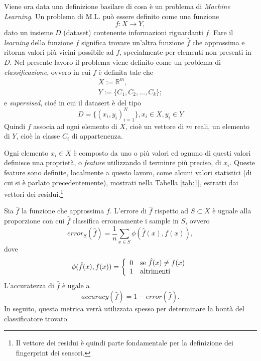 \documentclass[Lau,binding=0.6cm,noexaminfo]{sapthesis}
\begin{document}
Viene ora data una definizione basilare di cosa \`e un problema di \textit{Machine Learning}.
Un problema di M.L. pu\`o essere definito come una funzione 
\begin{equation}
f: X \to Y,\label{eq:3}
\end{equation}
dato un insieme $D$ (dataset) contenente informazioni riguardanti $f$.
Fare il \textit{learning} della funzione $f$ significa trovare un'altra funzione $\hat{f}$ che approssima e ritorna valori più vicini possibile ad $f$, specialmente per elementi non presenti in $D$.
Nel presente lavoro il problema viene definito come un problema di \textit{classificazione}, ovvero in cui $f$ \`e definita tale che
\begin{equation}
    \begin{array}{l}
    X := \mathbb{R}^m, \\
    Y := \{ C_1, C_2, \ldots, C_k \};
    \end{array}
\end{equation} 
e \textit{supervised}, cio\'e in cui il datasert \`e del tipo
\begin{equation}
    D = \{ (x_i, y_i)_{i=1}^N \}, x_i\in X, y_i\in Y
\end{equation}
Quindi $f$ associa ad ogni elemento di $X$, cio\`e un vettore di $m$ reali, un elemento di $Y$, cio\`e la classe $C_i$ di appartenenza.

Ogni elemento $x_i \in X$ \`e composto da uno o pi\`u valori ed ognuno di questi valori definisce una propriet\`a, o \textit{feature} utilizzando il terminre pi\`u preciso, di $x_i$. 
Queste feature sono definite, localmente a questo lavoro, come alcuni valori statistici (di cui si \`e parlato precedentemente), mostrati nella Tabella \ref{tab:1}, estratti dai vettori dei residui.\footnote{Il vettore dei residui \`e quindi parte fondamentale per la definizione dei fingerprint dei sensori.}

Sia $\hat{f}$ la funzione che approssima $f$. L'errore di $\hat{f}$ rispetto ad $S \subset X$ \`e uguale alla proporzione con cui $\hat{f}$ classifica erroneamente i sample in $S$, ovvero
\begin{equation}
    error_{S}(\hat{f}) = \frac{1}{n} \sum_{x\in S} \phi(\hat{f}(x), f(x)),
\end{equation}
dove
\begin{equation}
    \phi(\hat{f}(x), f(x)) = \left\{
        \begin{array}{rl}
            0 & \mbox{se $ \hat{f}(x) \ne f(x)$}\\
            1 & \mbox{altrimenti}
        \end{array}
    \right
    .
\end{equation}
L'accuratezza di $\hat{f}$ \`e ugale a
\begin{equation}
    accuracy(\hat{f}) = 1 - error(\hat{f}).
\end{equation}
In seguito, questa metrica verr\`a utilizzata spesso per determinare la bont\`a del classificatore trovato.
\end{document}
